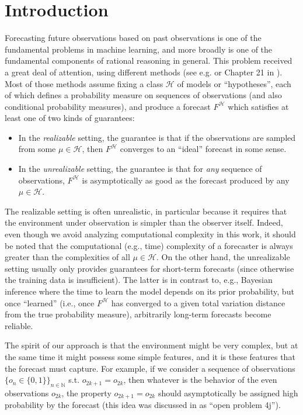 \documentclass[aop,preprint]{imsart}
\numberwithin{equation}{section}
\theoremstyle{definition}
\theoremstyle{plain}
\newcommand{\Nats}{\mathbb{N}}
\newcommand{\MC}{\mathcal{H}}
\begin{document}

\section{Introduction}

Forecasting future observations based on past observations is one of the fundamental problems in machine learning, and more broadly is one of the fundamental components of rational reasoning in general. This problem received a great deal of attention, using different methods (see e.g. \cite{Cesa-Bianchi_2006} or Chapter 21 in \cite{Shalev-Shwartz_2014}). Most of those methods assume fixing a class $\MC$ of models or \enquote{hypotheses}, each of which defines a probability measure on sequences of observations (and also conditional probability measures), and produce a forecast $F^\MC$ which satisfies at least one of two kinds of guarantees:

\begin{itemize}
\item 
In the \emph{realizable} setting, the guarantee is that if the observations are sampled from some $\mu \in \MC$, then $F^\MC$ converges to an \enquote{ideal} forecast in some sense.
\item
In the \emph{unrealizable} setting, the guarantee is that for \emph{any} sequence of observations, $F^\MC$ is asymptotically as good as the forecast produced by any $\mu \in \MC$.
\end{itemize}

The realizable setting is often unrealistic, in particular because it requires that the environment under observation is simpler than the observer itself. Indeed, even though we avoid analyzing computational complexity in this work, it should be noted that the computational (e.g., time) complexity of a forecaster is always greater than the complexities of all $\mu \in \MC$. On the other hand, the unrealizable setting usually only provides guarantees for short-term forecasts (since otherwise the training data is insufficient). The latter is in contrast to, e.g., Bayesian inference where the time to learn the model depends on its prior probability, but once \enquote{learned} (i.e., once $F^\MC$ has converged to a given total variation distance from the true probability measure), arbitrarily long-term forecasts become reliable.

The spirit of our approach is that the environment might be very complex, but at the same time it might possess some simple features, and it is these features that the forecast must capture. For example, if we consider a sequence of observations $\{o_n \in \{0,1\}\}_{n \in \Nats}$ s.t. $o_{2k+1}=o_{2k}$, then whatever is the behavior of the even observations $o_{2k}$, the property $o_{2k+1}=o_{2k}$ should asymptotically be assigned high probability by the forecast (this idea was discussed in \cite{Hutter_2009} as \enquote{open problem 4j}).
\end{document}
